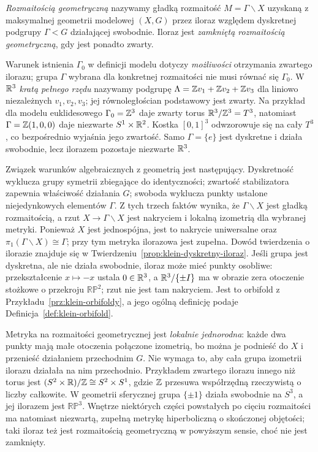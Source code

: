 \begin{definicja}
\label{def:thurston-rozmaitosc-geometryczna}
\emph{Rozmaitością geometryczną} nazywamy gładką rozmaitość
$M=\Gamma\backslash X$ uzyskaną z maksymalnej geometrii modelowej $(X,G)$
przez iloraz względem dyskretnej podgrupy $\Gamma<G$ działającej
swobodnie. Iloraz jest \emph{zamkniętą rozmaitością geometryczną},
gdy jest ponadto zwarty.
\end{definicja}

Warunek istnienia $\Gamma_0$ w definicji modelu dotyczy
\emph{możliwości} otrzymania zwartego ilorazu; grupa $\Gamma$
wybrana dla konkretnej rozmaitości nie musi równać się $\Gamma_0$.
W $\mathbb{R}^3$ \emph{kratą pełnego rzędu} nazywamy podgrupę
$\Lambda=\mathbb{Z} v_1+\mathbb{Z} v_2+\mathbb{Z} v_3$ dla liniowo niezależnych
$v_1,v_2,v_3$; jej równoległościan podstawowy jest zwarty.
Na przykład dla modelu euklidesowego $\Gamma_0=\mathbb{Z}^3$ daje
zwarty torus $\mathbb{R}^3/\mathbb{Z}^3=T^3$, natomiast
$\Gamma=\mathbb{Z}(1,0,0)$ daje niezwarte $S^1\times\mathbb{R}^2$.
Kostka $[0,1]^3$ odwzorowuje się na cały $T^3$, co bezpośrednio
wyjaśnia jego zwartość. Samo $\Gamma=\{e\}$ jest dyskretne
i działa swobodnie, lecz ilorazem pozostaje niezwarte $\mathbb{R}^3$.

Związek warunków algebraicznych z geometrią jest następujący.
Dyskretność wyklucza grupy symetrii zbiegające do identyczności;
zwartość stabilizatora zapewnia właściwość działania $G$;
swoboda wyklucza punkty ustalone niejedynkowych elementów $\Gamma$.
Z tych trzech faktów wynika, że $\Gamma\backslash X$ jest gładką
rozmaitością, a rzut $X\to\Gamma\backslash X$ jest nakryciem i lokalną
izometrią dla wybranej metryki. Ponieważ $X$ jest jednospójna,
jest to nakrycie uniwersalne oraz
$\pi_1(\Gamma\backslash X)\cong\Gamma$; przy tym metryka ilorazowa
jest zupełna. Dowód twierdzenia o ilorazie znajduje się w
Twierdzeniu~\ref{prop:klein-dyskretny-iloraz}.
Jeśli grupa jest dyskretna, ale nie działa swobodnie,
iloraz może mieć punkty osobliwe: przekształcenie
$x\mapsto-x$ ustala $0\in\mathbb{R}^3$, a $\mathbb{R}^3/\{\pm I\}$
ma w obrazie zera otoczenie stożkowe o przekroju
$\mathbb{RP}^2$; rzut nie jest tam nakryciem. Jest to orbifold
z Przykładu~\ref{prz:klein-orbifoldy}, a jego ogólną definicję
podaje Definicja~\ref{def:klein-orbifold}.

Metryka na rozmaitości geometrycznej jest \emph{lokalnie
jednorodna}: każde dwa punkty mają małe otoczenia połączone
izometrią, bo można je podnieść do $X$ i przenieść działaniem
przechodnim $G$. Nie wymaga to, aby cała grupa izometrii ilorazu
działała na nim przechodnio. Przykładem zwartego ilorazu innego
niż torus jest $(S^2\times\mathbb{R})/\mathbb{Z}\cong S^2\times S^1$,
gdzie $\mathbb{Z}$ przesuwa współrzędną rzeczywistą o liczby całkowite.
W geometrii sferycznej grupa $\{\pm1\}$ działa swobodnie
na $S^3$, a jej ilorazem jest $\mathbb{RP}^3$.
Wnętrze niektórych części powstałych po cięciu rozmaitości
ma natomiast niezwartą, zupełną metrykę hiperboliczną
o skończonej objętości; taki iloraz też jest rozmaitością
geometryczną w powyższym sensie, choć nie jest zamknięty.


